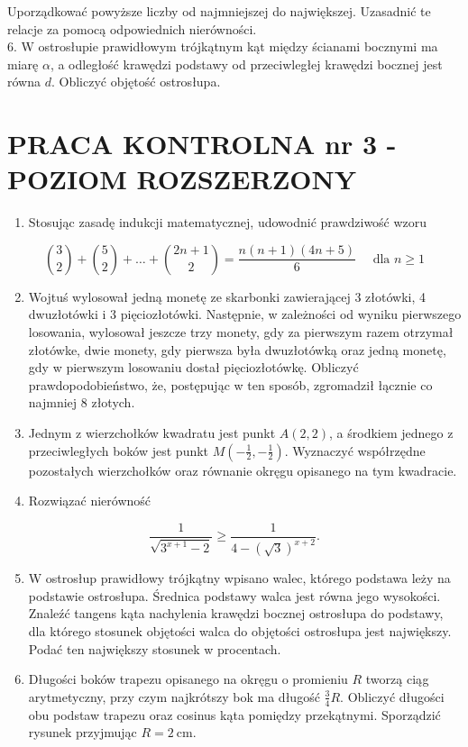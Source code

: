 \documentclass[10pt]{article}
\begin{document}
Uporządkować powyższe liczby od najmniejszej do największej. Uzasadnić te relacje za pomocą odpowiednich nierówności.\\
6. W ostrosłupie prawidłowym trójkątnym kąt między ścianami bocznymi ma miarę $\alpha$, a odległość krawędzi podstawy od przeciwległej krawędzi bocznej jest równa $d$. Obliczyć objętość ostrosłupa.

\section*{PRACA KONTROLNA nr 3 -POZIOM ROZSZERZONY}
\begin{enumerate}
  \item Stosując zasadę indukcji matematycznej, udowodnić prawdziwość wzoru
\end{enumerate}

$$
\binom{3}{2}+\binom{5}{2}+\ldots+\binom{2 n+1}{2}=\frac{n(n+1)(4 n+5)}{6} \quad \text { dla } n \geqslant 1
$$

\begin{enumerate}
  \setcounter{enumi}{1}
  \item Wojtuś wylosował jedną monetę ze skarbonki zawierającej 3 złotówki, 4 dwuzłotówki i 3 pięciozłotówki. Następnie, w zależności od wyniku pierwszego losowania, wylosował jeszcze trzy monety, gdy za pierwszym razem otrzymał złotówke, dwie monety, gdy pierwsza była dwuzłotówką oraz jedną monetę, gdy w pierwszym losowaniu dostał pięciozłotówkę. Obliczyć prawdopodobieństwo, że, postępując w ten sposób, zgromadził łącznie co najmniej 8 złotych.
  \item Jednym z wierzchołków kwadratu jest punkt $A(2,2)$, a środkiem jednego z przeciwległych boków jest punkt $M\left(-\frac{1}{2},-\frac{1}{2}\right)$. Wyznaczyć współrzędne pozostałych wierzchołków oraz równanie okręgu opisanego na tym kwadracie.
  \item Rozwiązać nierówność
\end{enumerate}

$$
\frac{1}{\sqrt{3^{x+1}-2}} \geqslant \frac{1}{4-(\sqrt{3})^{x+2}} .
$$

\begin{enumerate}
  \setcounter{enumi}{4}
  \item W ostrosłup prawidłowy trójkątny wpisano walec, którego podstawa leży na podstawie ostrosłupa. Średnica podstawy walca jest równa jego wysokości. Znaleźć tangens kąta nachylenia krawędzi bocznej ostrosłupa do podstawy, dla którego stosunek objętości walca do objętości ostrosłupa jest największy. Podać ten największy stosunek w procentach.
  \item Długości boków trapezu opisanego na okręgu o promieniu $R$ tworzą ciąg arytmetyczny, przy czym najkrótszy bok ma długość $\frac{3}{4} R$. Obliczyć długości obu podstaw trapezu oraz cosinus kąta pomiędzy przekątnymi. Sporządzić rysunek przyjmując $R=2 \mathrm{~cm}$.
\end{enumerate}
\end{document}
